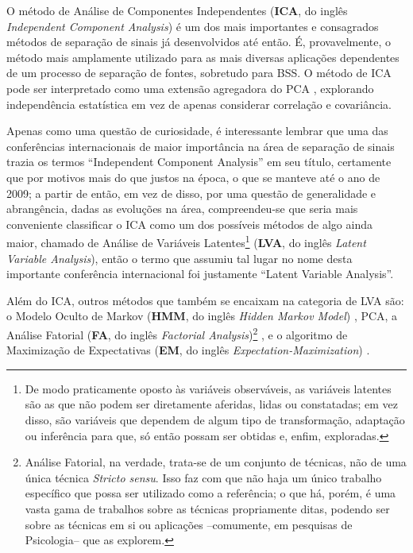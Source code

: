O método de Análise de Componentes Independentes (\textbf{ICA}, do inglês \textit{Independent Component Analysis}) é um dos mais importantes e consagrados métodos de separação de sinais já desenvolvidos até então. É, provavelmente, o método mais amplamente utilizado para as mais diversas aplicações dependentes de um processo de separação de fontes, sobretudo para BSS. O método de ICA pode ser interpretado como uma extensão agregadora do PCA \citep{COMON1994287}, explorando independência estatística em vez de apenas considerar correlação e covariância.


Apenas como uma questão de curiosidade, é interessante lembrar que uma das conferências internacionais de maior importância na área de separação de sinais trazia os termos ``Independent Component Analysis'' em seu título, certamente que por motivos mais do que justos na época, o que se manteve até o ano de 2009; a partir de então, em vez de disso, por uma questão de generalidade e abrangência, dadas as evoluções na área, compreendeu-se que seria mais conveniente classificar o ICA como um dos possíveis métodos de algo ainda maior, chamado de Análise de Variáveis Latentes\footnote{De modo praticamente oposto às variáveis observáveis, as variáveis latentes são as que não podem ser diretamente aferidas, lidas ou constatadas; em vez disso, são variáveis que dependem de algum tipo de transformação, adaptação ou inferência para que, só então possam ser obtidas e, enfim, exploradas.} (\textbf{LVA}, do inglês \textit{Latent Variable Analysis}), então o termo que assumiu tal lugar no nome desta importante conferência internacional foi justamente ``Latent Variable Analysis''.


Além do ICA, outros métodos que também se encaixam na categoria de LVA são: o Modelo Oculto de Markov (\textbf{HMM}, do inglês \textit{Hidden Markov Model}) \citep{18626}, PCA, a Análise Fatorial (\textbf{FA}, do inglês \textit{Factorial Analysis})\footnote{Análise Fatorial, na verdade, trata-se de um conjunto de técnicas, não de uma única técnica \textit{Stricto sensu}. Isso faz com que não haja um único trabalho específico que possa ser utilizado como a referência; o que há, porém, é uma vasta gama de trabalhos sobre as técnicas propriamente ditas, podendo ser sobre as técnicas em si ou aplicações --comumente, em pesquisas de Psicologia-- que as explorem.} \citep{vincent1953orgin, c63851e778034799a99dcc4d187768d0, doi:10.1177/001316446002000116}, e o algoritmo de Maximização de Expectativas (\textbf{EM}, do inglês \textit{Expectation-Maximization}) \citep{dempster1977maximum}.

